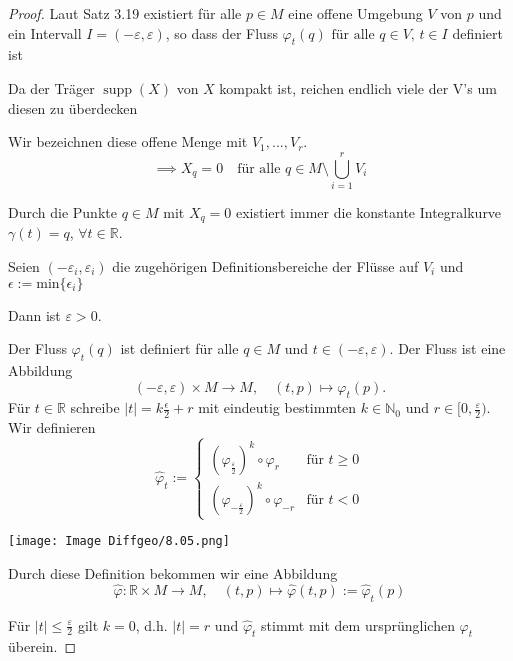 \documentclass[fleqn, 12pt, letterpaper]{article}
\begin{document}
\vspace{1em}
\begin{proof}
\quad

Laut Satz 3.19 existiert für alle $p \in M$ eine offene Umgebung $V$ von $p$ und ein Intervall $I = (-\varepsilon, \varepsilon)$, so dass 
 der Fluss $\varphi_t(q)$
\(\text{für alle } q \in V, \, t \in I\) definiert ist

Da der Träger $\operatorname{supp}(X)$ von $X$ kompakt ist, reichen endlich viele der V's um diesen zu überdecken

\vspace{0.5em}

Wir bezeichnen diese offene Menge mit $V_1,...,V_r$.
\[
\implies X_q = 0 \quad \text{für alle } q \in M \setminus \bigcup_{i=1}^r V_i
\]

Durch die Punkte $q \in M$ mit $X_q = 0$ existiert immer die konstante Integralkurve $\gamma(t)=q$, $\forall t \in \mathbb{R}$. 

Seien $(-\varepsilon_i, \varepsilon_i)$ die zugehörigen Definitionsbereiche der Flüsse auf $V_i$ und $\epsilon:=\mathrm{min}\{\epsilon_i\}$

Dann ist $\varepsilon > 0$.

Der Fluss $\varphi_t(q)$ ist definiert für alle $q \in M$ und $t \in (-\varepsilon, \varepsilon)$. Der Fluss ist eine Abbildung
\[
(-\varepsilon, \varepsilon) \times M \longrightarrow M, \quad (t, p) \longmapsto \varphi_t(p).
\]
Für $t \in \mathbb{R}$ schreibe $|t| = k\frac{\epsilon}{2}+r $ mit eindeutig bestimmten $k \in \mathbb{N}_0$ und $r \in [0, \frac{\varepsilon}{2})$.\\

Wir definieren
\[
\hat{\varphi}_t := 
\begin{cases} 
\left(\varphi_{\frac{\varepsilon}{2}}\right)^k \circ \varphi_r
 & \text{für } t \geq 0 \\[1em]
\left(\varphi_{-\frac{\varepsilon}{2}}\right)^k \circ \varphi_{-r}
 & \text{für } t < 0 
\end{cases}
\]

\texttt{[image: Image Diffgeo/8.05.png]}

Durch diese Definition bekommen wir eine Abbildung
\[
\hat{\varphi} : \mathbb{R} \times M \longrightarrow M, \quad (t, p) \longmapsto \hat{\varphi}(t, p) := \hat{\varphi}_t(p)
\]

\vspace{1em}

Für $\lvert t \rvert \leq \frac{\varepsilon}{2}$ gilt $k = 0$, d.h. $\lvert t \rvert = r$ und $\hat{\varphi}_t$ stimmt mit dem ursprünglichen $\varphi_t$ überein.


\end{proof}
\end{document}

